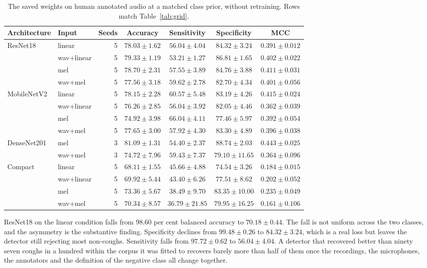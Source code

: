 \documentclass{ieeeaccess}
\begin{document}
\begin{table}[tbp]
\caption{The saved weights on human annotated audio at a matched class prior, without retraining. Rows match Table~\ref{tab:grid}.}\label{tab:external}
\small
\begin{tabular}{@{}llrcccc@{}}
\toprule
Architecture & Input & Seeds & Accuracy & Sensitivity & Specificity & MCC \\
\midrule
ResNet18 & linear & 5 & $78.03 \pm 1.62$ & $56.04 \pm 4.04$ & $84.32 \pm 3.24$ & $0.391 \pm 0.012$ \\
 & wav+linear & 5 & $79.33 \pm 1.19$ & $53.21 \pm 1.27$ & $86.81 \pm 1.65$ & $0.402 \pm 0.022$ \\
 & mel & 5 & $78.70 \pm 2.31$ & $57.55 \pm 3.89$ & $84.76 \pm 3.88$ & $0.411 \pm 0.031$ \\
 & wav+mel & 5 & $77.56 \pm 3.18$ & $59.62 \pm 2.78$ & $82.70 \pm 4.34$ & $0.401 \pm 0.056$ \\
\addlinespace
MobileNetV2 & linear & 5 & $78.15 \pm 2.28$ & $60.57 \pm 5.48$ & $83.19 \pm 4.26$ & $0.415 \pm 0.024$ \\
 & wav+linear & 5 & $76.26 \pm 2.85$ & $56.04 \pm 3.92$ & $82.05 \pm 4.46$ & $0.362 \pm 0.039$ \\
 & mel & 5 & $74.92 \pm 3.98$ & $66.04 \pm 4.11$ & $77.46 \pm 5.97$ & $0.392 \pm 0.054$ \\
 & wav+mel & 5 & $77.65 \pm 3.00$ & $57.92 \pm 4.30$ & $83.30 \pm 4.89$ & $0.396 \pm 0.038$ \\
\addlinespace
DenseNet201 & mel & 3 & $81.09 \pm 1.31$ & $54.40 \pm 2.37$ & $88.74 \pm 2.03$ & $0.443 \pm 0.025$ \\
 & wav+mel & 3 & $74.72 \pm 7.96$ & $59.43 \pm 7.37$ & $79.10 \pm 11.65$ & $0.364 \pm 0.096$ \\
\addlinespace
Compact & linear & 5 & $68.11 \pm 1.55$ & $45.66 \pm 4.88$ & $74.54 \pm 3.26$ & $0.184 \pm 0.015$ \\
 & wav+linear & 5 & $69.92 \pm 5.44$ & $43.40 \pm 6.26$ & $77.51 \pm 8.62$ & $0.202 \pm 0.052$ \\
 & mel & 5 & $73.36 \pm 5.67$ & $38.49 \pm 9.70$ & $83.35 \pm 10.00$ & $0.235 \pm 0.049$ \\
 & wav+mel & 5 & $70.34 \pm 8.57$ & $36.79 \pm 21.85$ & $79.95 \pm 16.25$ & $0.161 \pm 0.106$ \\
\bottomrule
\end{tabular}
\end{table}

ResNet18 on the linear condition falls from $98.60$ per cent balanced accuracy to
$70.18 \pm 0.44$. The fall is not uniform across the two classes, and the asymmetry is the
substantive finding. Specificity declines from $99.48 \pm 0.26$ to $84.32 \pm 3.24$, which
is a real loss but leaves the detector still rejecting most non-coughs. Sensitivity falls
from $97.72 \pm 0.62$ to $56.04 \pm 4.04$. A detector that recovered better than ninety
seven coughs in a hundred within the corpus it was fitted to recovers barely more than
half of them once the recordings, the microphones, the annotators and the definition of
the negative class all change together.
\end{document}
